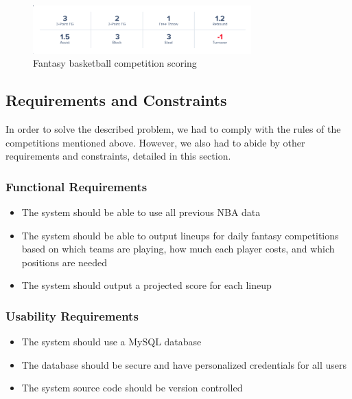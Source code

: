 \begin{figure}[ht]
    \centering
    \includegraphics[width=0.75\textwidth]{figures/fantasy_competition_scoring}
    \caption{Fantasy basketball competition scoring}
    \label{fig:comp_scoring}
\end{figure}

\subsection{Requirements and Constraints}
In order to solve the described problem, we had to comply with the rules of the competitions mentioned above. However, we also had to abide by other requirements and constraints, detailed in this section.
\subsubsection{Functional Requirements}
\begin{itemize}
\item The system should be able to use all previous NBA data
\item The system should be able to output lineups for daily fantasy competitions based on which teams are playing, how much each player costs, and which positions are needed
\item The system should output a projected score for each lineup
\end{itemize}

\subsubsection{Usability Requirements}
\begin{itemize}
\item The system should use a MySQL database
\item The database should be secure and have personalized credentials for all users
\item The system source code should be version controlled
\end{itemize}

